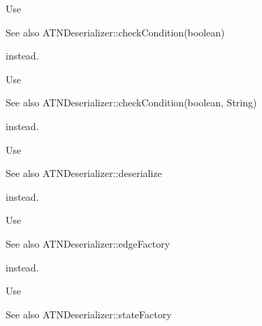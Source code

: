 
\begin{DoxyRefList}
\item[\label{deprecated__deprecated000002}%
\Hypertarget{deprecated__deprecated000002}%
Member \hyperlink{classantlr4_1_1atn_1_1ATNSimulator_aa827be017f3bf3a431ef91972d38e3d1}{antlr4\+:\+:atn\+:\+:A\+T\+N\+Simulator\+:\+:check\+Condition} (bool condition)]Use \begin{DoxySeeAlso}{See also}
A\+T\+N\+Deserializer\+::check\+Condition(boolean)


\end{DoxySeeAlso}
instead.  
\item[\label{deprecated__deprecated000003}%
\Hypertarget{deprecated__deprecated000003}%
Member \hyperlink{classantlr4_1_1atn_1_1ATNSimulator_a394cdeb1e2d6028bc73e0f1d22830b3d}{antlr4\+:\+:atn\+:\+:A\+T\+N\+Simulator\+:\+:check\+Condition} (bool condition, const std\+::string \&message)]Use \begin{DoxySeeAlso}{See also}
A\+T\+N\+Deserializer\+::check\+Condition(boolean, String)


\end{DoxySeeAlso}
instead.  
\item[\label{deprecated__deprecated000001}%
\Hypertarget{deprecated__deprecated000001}%
Member \hyperlink{classantlr4_1_1atn_1_1ATNSimulator_ae516df637ee1f4be4787d533ed88b3b9}{antlr4\+:\+:atn\+:\+:A\+T\+N\+Simulator\+:\+:deserialize} (const std\+::vector$<$ uint16\+\_\+t $>$ \&data)]Use \begin{DoxySeeAlso}{See also}
A\+T\+N\+Deserializer\+::deserialize


\end{DoxySeeAlso}
instead.  
\item[\label{deprecated__deprecated000004}%
\Hypertarget{deprecated__deprecated000004}%
Member \hyperlink{classantlr4_1_1atn_1_1ATNSimulator_a8e3fc8caefaecf90ac5eb45561aafdcc}{antlr4\+:\+:atn\+:\+:A\+T\+N\+Simulator\+:\+:edge\+Factory} (const A\+TN \&atn, int type, int src, int trg, int arg1, int arg2, int arg3, const std\+::vector$<$ misc\+::\+Interval\+Set $>$ \&sets)]Use \begin{DoxySeeAlso}{See also}
A\+T\+N\+Deserializer\+::edge\+Factory


\end{DoxySeeAlso}
instead.  
\item[\label{deprecated__deprecated000005}%
\Hypertarget{deprecated__deprecated000005}%
Member \hyperlink{classantlr4_1_1atn_1_1ATNSimulator_a57878604b6496cc6aa80e29811e05660}{antlr4\+:\+:atn\+:\+:A\+T\+N\+Simulator\+:\+:state\+Factory} (int type, int rule\+Index)]Use \begin{DoxySeeAlso}{See also}
A\+T\+N\+Deserializer\+::state\+Factory



\end{DoxySeeAlso}
\end{DoxyRefList}
